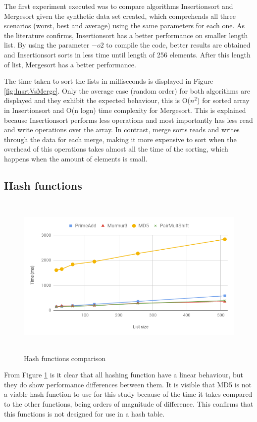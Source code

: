 \documentclass[a4paper,12pt]{article}
\begin{document}
The first experiment executed was to compare algorithms Insertionsort and Mergesort given the synthetic data set created, which comprehends all three scenarios (worst, best and average) using the same parameters for each one. As the literature confirms, Insertionsort has a better performance on smaller length list. By using the parameter $-o2$ to compile the code, better results are obtained and Insertionsort sorts in less time until length of 256 elements. After this length of list, Mergesort has a better performance.

The time taken to sort the lists in milliseconds is displayed in Figure \ref{fig:InsrtVsMerge}. Only the average case (random order) for both algorithms are displayed and they exhibit the expected behaviour, this is  O(${n}^2$) for sorted array in Insertionsort and O(n logn) time complexity for Mergesort. This is explained because Insertionsort performs less operations and most importantly has less read and write operations over the array. In contrast, merge sorts reads and writes through the data for each merge, making it more expensive to sort when the overhead of this operations takes almost all the time of the sorting, which happens when the amount of elements is small.

\subsection{Hash functions}

\begin{figure}[H]
    \centering
    \includegraphics[height=8cm,keepaspectratio]{./images/hashes.png}
    \caption{Hash functions comparison}
    \label{fig:HashesFunc}
\end{figure}

From Figure \ref{fig:HashesFunc} is it clear that all hashing function have a linear behaviour, but they do show performance differences between them. It is visible that MD5 is not a viable hash function to use for this study because of the time it takes compared to the other functions, being orders of magnitude of difference. This confirms that this functions is not designed for use in a hash table.
\end{document}
